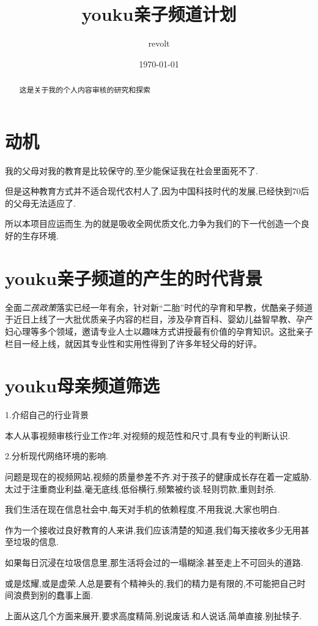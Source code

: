 \documentclass[UTF8]{ctexart}
\title{youku亲子频道计划}
\author{revolt}
\date{\today}
\begin{document}
\maketitle
\tableofcontents

\begin{abstract}
这是关于我的个人内容审核的研究和探索
\end{abstract}
\section{动机}
我的父母对我的教育是比较保守的,至少能保证我在社会里面死不了.

但是这种教育方式并不适合现代农村人了,因为中国科技时代的发展,已经快到70后的父母无法适应了.

所以本项目应运而生.为的就是吸收全网优质文化,力争为我们的下一代创造一个良好的生存环境.

\section{youku亲子频道的产生的时代背景}
全面\emph{二孩政策}落实已经一年有余，针对新“二胎”时代的孕育和早教，优酷亲子频道于近日上线了一大批优质亲子内容的栏目，涉及孕育百科、婴幼儿益智早教、孕产妇心理等多个领域，邀请专业人士以趣味方式讲授最有价值的孕育知识。这批亲子栏目一经上线，就因其专业性和实用性得到了许多年轻父母的好评。
\section{youku母亲频道筛选}

1.介绍自己的行业背景

本人从事视频审核行业工作2年,对视频的规范性和尺寸,具有专业的判断认识.

2.分析现代网络环境的影响.

问题是现在的视频网站,视频的质量参差不齐.对于孩子的健康成长存在着一定威胁.
太过于注重商业利益,毫无底线,低俗横行,频繁被约谈.轻则罚款,重则封杀.

我们生活在现在信息社会中,每天对手机的依赖程度,不用我说,大家也明白.

作为一个接收过良好教育的人来讲,我们应该清楚的知道,我们每天接收多少无用甚至垃圾的信息.

如果每日沉浸在垃圾信息里,那生活将会过的一塌糊涂.甚至走上不可回头的道路.

或是炫耀,或是虚荣.人总是要有个精神头的,我们的精力是有限的,不可能把自己时间浪费到别的蠢事上面.

上面从这几个方面来展开,要求高度精简,别说废话.和人说话,简单直接.别扯犊子.
\end{document}
